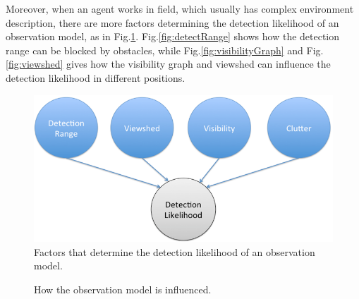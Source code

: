 \documentclass[12pt]{article}
\begin{document}
Moreover, when an agent works in field, which usually has complex environment description, there are more factors determining the detection likelihood of an observation model, as in Fig.\ref{fig:obsFactors}. Fig.\ref{fig:detectRange} shows how the detection range can be blocked by obstacles, while Fig.\ref{fig:visibilityGraph} and Fig.\ref{fig:viewshed} gives how the visibility graph and viewshed can influence the detection likelihood in different positions. 

\begin{figure}
\centering
\includegraphics[width=0.7\linewidth]{./images/obsFactors}
\caption{Factors that determine the detection likelihood of an observation model.}
\label{fig:obsFactors}
\end{figure}

\begin{figure} 
  \centering 
  \caption{How the observation model is influenced.}
  \label{fig:factorsOnObs} %
\end{figure}
\end{document}
